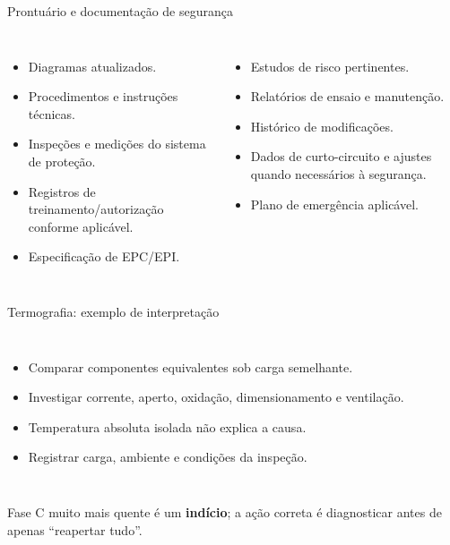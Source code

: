 \begin{frame}{Prontuário e documentação de segurança}
\small
\begin{columns}[T,onlytextwidth]
\begin{itemize}
\item Diagramas atualizados.
\item Procedimentos e instruções técnicas.
\item Inspeções e medições do sistema de proteção.
\item Registros de treinamento/autorização conforme aplicável.
\item Especificação de EPC/EPI.
\end{itemize}
\begin{itemize}
\item Estudos de risco pertinentes.
\item Relatórios de ensaio e manutenção.
\item Histórico de modificações.
\item Dados de curto-circuito e ajustes quando necessários à segurança.
\item Plano de emergência aplicável.
\end{itemize}
\end{columns}
\end{frame}

\begin{frame}{Termografia: exemplo de interpretação}
\small
\begin{columns}[T,onlytextwidth]
\begin{itemize}
\item Comparar componentes equivalentes sob carga semelhante.
\item Investigar corrente, aperto, oxidação, dimensionamento e ventilação.
\item Temperatura absoluta isolada não explica a causa.
\item Registrar carga, ambiente e condições da inspeção.
\end{itemize}
\end{columns}
\begin{caixaAt}
Fase C muito mais quente é um \textbf{indício}; a ação correta é diagnosticar antes de apenas ``reapertar tudo''.
\end{caixaAt}
\end{frame}

